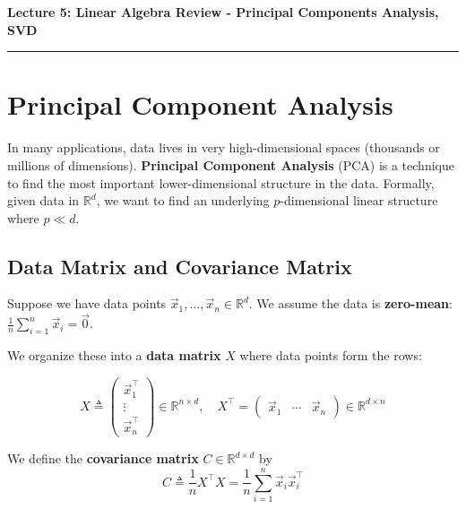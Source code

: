 \documentclass[10pt, twocolumn]{article}
\theoremstyle{definition}
\theoremstyle{plain}
\newcommand{\RR}{\mathbb{R}}
\begin{document}
\noindent
\begin{minipage}{\linewidth}
    \centering
    \textbf{\Large Lecture 5: Linear Algebra Review - Principal Components Analysis, SVD} \\[0.5em]
    \hrule
\end{minipage}
\vspace{1em}


\section{Principal Component Analysis}

In many applications, data lives in very high-dimensional spaces (thousands or millions of dimensions). \textbf{Principal Component Analysis} (PCA) is a technique to find the most important lower-dimensional structure in the data. Formally, given data in $\RR^d$, we want to find an underlying $p$-dimensional linear structure where $p \ll d$.

\subsection{Data Matrix and Covariance Matrix}

Suppose we have data points $\vec{x}_1, \ldots, \vec{x}_n \in \RR^d$. We assume the data is \textbf{zero-mean}: $\frac{1}{n} \sum_{i=1}^{n} \vec{x}_i = \vec{0}$.

We organize these into a \textbf{data matrix} $X$ where data points form the rows:
\begin{result}
\[
    X \triangleq \begin{pmatrix} \vec{x}_1^\top \\ \vdots \\ \vec{x}_n^\top \end{pmatrix} \!\in \RR^{n \times d}, \quad X^\top = \begin{pmatrix} \vec{x}_1 & \!\cdots\! & \vec{x}_n \end{pmatrix} \!\in \RR^{d \times n}
\]
\end{result}

We define the \textbf{covariance matrix} $C \in \RR^{d \times d}$ by
\[
    C \triangleq \frac{1}{n} X^\top X = \frac{1}{n} \sum_{i=1}^{n} \vec{x}_i \vec{x}_i^\top
\]
\end{document}
